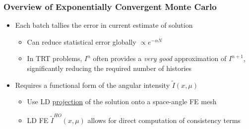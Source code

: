 \documentclass[xcolor=dvipsnames,hyperref={pdfpagelabels=false},unknownkeysallowed]{beamer}
\renewcommand{\u}[1]{\underline{#1}}
\newcommand{\colb}[1]{{\color{blue} #1}}
\newcommand{\colr}[1]{{\color{red} #1}}
\newlength{\wideitemsep}
\let\olditem\item
\renewcommand{\item}{\setlength{\itemsep}{\wideitemsep}\olditem}
\begin{document}
\begin{frame}
    \frametitle{Overview of Exponentially Convergent Monte Carlo}
    \begin{itemize}
        \item Each batch tallies the \colb{error} in current estimate of solution
            \begin{itemize}
    \item Can reduce statistical error \colb{globally} $\propto e^{-\alpha N}$
    \item In TRT problems, $I^{n}$ often provides a \emph{very good} approximation of
        $I^{n+1}$, significantly reducing the required number of histories
\end{itemize}
     \end{itemize}
    \begin{minipage}{0.6\linewidth}
        \vspace{-2.0in}
        
     \begin{itemize}
     \item Requires a \colr{functional form} of the angular intensity $\tilde I(x,\mu)$
            \begin{itemize}
                \item Use LD \u{\colb{projection}} of the solution onto a space-angle FE
                    mesh
        \item LD FE $\tilde  I^{HO}(x,\mu)$ allows for direct computation of
            consistency terms
    \end{itemize}
    \end{itemize}
    \end{minipage}
    \begin{minipage}[t]{0.3\linewidth}
        \centering
    \end{minipage}%
\end{frame}
\end{document}
